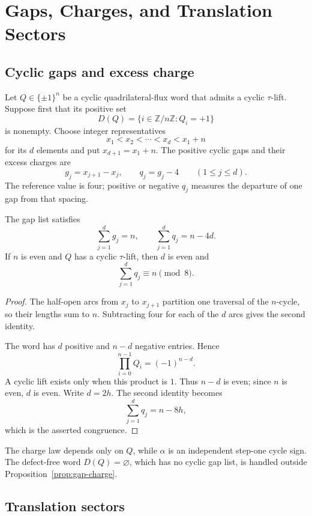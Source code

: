 \section{Gaps, Charges, and Translation Sectors}
\label{sec:gaps-charges-sectors}

\subsection{Cyclic gaps and excess charge}
\label{subsec:cyclic-gaps-excess-charge}

Let \(Q\in\{\pm1\}^n\) be a cyclic quadrilateral-flux word that admits a
cyclic \(\tau\)-lift.  Suppose first that its positive set
\[
D(Q)=\{i\in\mathbb Z/n\mathbb Z:Q_i=+1\}
\]
is nonempty.  Choose integer representatives
\[
x_1<x_2<\cdots<x_d<x_1+n
\]
for its \(d\) elements and put \(x_{d+1}=x_1+n\).  The positive cyclic gaps
and their excess charges are
\[
g_j=x_{j+1}-x_j,\qquad q_j=g_j-4
\qquad(1\leq j\leq d).
\]
The reference value is four; positive or negative \(q_j\) measures the
departure of one gap from that spacing.

\begin{proposition}\label{prop:gap-charge}
The gap list satisfies
\[
\sum_{j=1}^d g_j=n,\qquad
\sum_{j=1}^d q_j=n-4d.
\]
If \(n\) is even and \(Q\) has a cyclic \(\tau\)-lift, then \(d\) is even
and
\[
\sum_{j=1}^d q_j\equiv n\pmod8.
\]
\end{proposition}

\begin{proof}
The half-open arcs from \(x_j\) to \(x_{j+1}\) partition one traversal of
the \(n\)-cycle, so their lengths sum to \(n\).  Subtracting four for each
of the \(d\) arcs gives the second identity.

The word has \(d\) positive and \(n-d\) negative entries.  Hence
\[
\prod_{i=0}^{n-1}Q_i=(-1)^{n-d}.
\]
A cyclic lift exists only when this product is \(1\).  Thus \(n-d\) is
even; since \(n\) is even, \(d\) is even.  Write \(d=2h\).  The second
identity becomes
\[
\sum_{j=1}^d q_j=n-8h,
\]
which is the asserted congruence.
\end{proof}

The charge law depends only on \(Q\), while \(\alpha\) is an independent
step-one cycle sign. The defect-free word \(D(Q)=\varnothing\), which has no
cyclic gap list, is handled outside Proposition~\ref{prop:gap-charge}.

\subsection{Translation sectors}
\label{subsec:translation-sectors}

